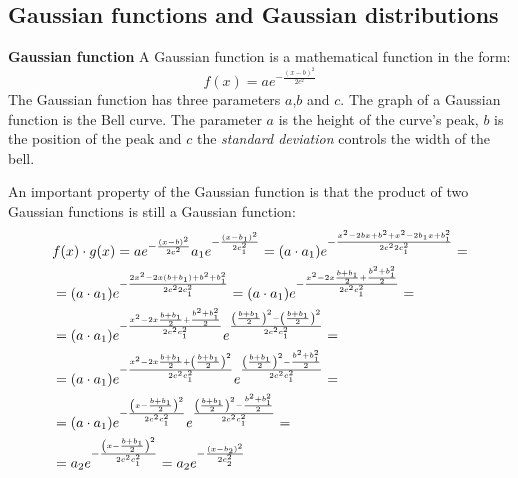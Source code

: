 \subsection{Gaussian functions and Gaussian distributions}
\label{gaussian}
\begin{definition}{\textbf{Gaussian function}}
A Gaussian function is a mathematical function in the form:
\begin{equation}
f(x) = a e^{-\frac{(x-b)^2}{2c^2}}
\end{equation}
The Gaussian function has three parameters $a$,$b$ and $c$. The graph of a Gaussian function is the Bell curve. The parameter $a$ is the height of the curve's peak, $b$ is the position of the peak and $c$ the \textit{standard deviation} controls the width of the bell.

An important property of the Gaussian function is that the product of two Gaussian functions is still a Gaussian function:
\begin{equation}
\label{gauss2}
\begin{aligned}
&f(x) \cdot g(x) = a e^{-\frac{(x-b)^2}{2c^2}} a_1 e^{-\frac{(x-b_1)^2}{2c_1^2}} = (a\cdot a_1) e^{-\frac{x^2-2bx+b^2 + x^2-2b_1x+b_1^2}{2c^2 2c_1^2}}=\\
&= (a\cdot a_1) e^{-\frac{2x^2-2x(b+b_1)+ b^2 +b_1^2}{2c^2 2c_1^2}} = (a\cdot a_1) e^{-\frac{x^2-2x\frac{b +b_1}{2}+ \frac{b^2 +b_1^2}{2}}{2c^2 c_1^2}} = \\
&=(a\cdot a_1) e^{-\frac{x^2-2x\frac{b +b_1}{2}+ \frac{b^2 +b_1^2}{2}}{2c^2 c_1^2}} e^{\frac{\left(\frac{b +b_1}{2}\right)^2 - \left(\frac{b+b_1}{2}\right)^2 } {2c^2 c_1^2}}=  \\
&=(a\cdot a_1) e^{-\frac{x^2-2x\frac{b +b_1}{2}+\left(\frac{b +b_1}{2}\right)^2}{2c^2 c_1^2}} e^{\frac{\left(\frac{b +b_1}{2}\right)^2 - \frac{b^2 +b_1^2}{2}} {2c^2 c_1^2}} = \\
&=(a\cdot a_1) e^{-\frac{\left(x-\frac{b +b_1}{2}\right)^2}{2c^2 c_1^2}} e^{\frac{\left(\frac{b +b_1}{2}\right)^2 - \frac{b^2 +b_1^2}{2}} {2c^2 c_1^2}} = \\
&= a_2 e^{-\frac{\left(x-\frac{b +b_1}{2}\right)^2}{2c^2 c_1^2}} = a_2 e^{-\frac{\left(x-b_2\right)^2}{2c_2^2}}
\end{aligned}
\end{equation}
\end{definition}

